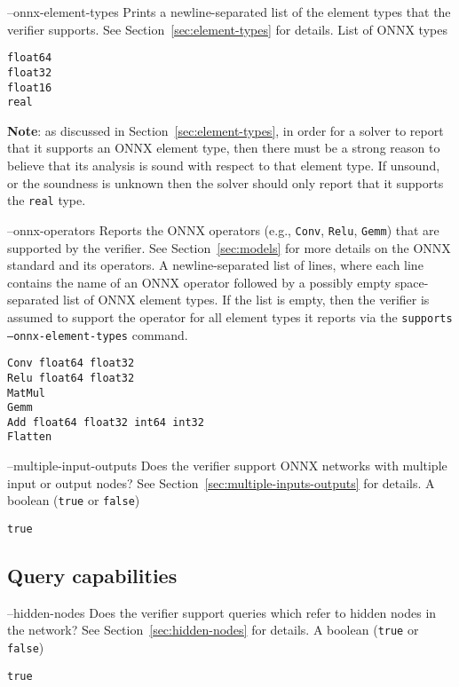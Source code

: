 \clOutputOption
{--onnx-element-types}
{Prints a newline-separated list of the element types that the verifier supports. See Section~\ref{sec:element-types} for details.}
{List of ONNX types}
\begin{lstlisting}[style=bash]
%*\exampleVerifier* supports --onnx-element-types
float64
float32
float16
real
\end{lstlisting}
\textbf{Note}: as discussed in Section~\ref{sec:element-types}, in order for a solver to report that it supports an ONNX element type, then there must be a strong reason to believe that its analysis is sound with respect to that element type. If unsound, or the soundness is unknown then the solver should only report that it supports the \texttt{real} type.

\clOutputOption
{--onnx-operators}
{Reports the ONNX operators (e.g., \texttt{Conv}, \texttt{Relu}, \texttt{Gemm}) that are supported by the verifier. See Section~\ref{sec:models} for more details on the ONNX standard and its operators. 
}
{A newline-separated list of lines, where each line contains the name of an ONNX operator followed by a possibly empty space-separated list of ONNX element types. If the list is empty, then the verifier is assumed to support the operator for all element types it reports via the \texttt{supports --onnx-element-types} command.
}
\begin{lstlisting}[style=bash]
%*\exampleVerifier* supports --onnx-operators
Conv float64 float32
Relu float64 float32
MatMul
Gemm
Add float64 float32 int64 int32
Flatten
\end{lstlisting}

\clOutputOption
{--multiple-input-outputs}
{Does the verifier support ONNX networks with multiple input or output nodes? See Section~\ref{sec:multiple-inputs-outputs} for details.}
{A boolean (\texttt{true} or \texttt{false})}
\begin{lstlisting}[style=bash]
%*\exampleVerifier* supports --multiple-inputs-outputs
true
\end{lstlisting}

\subsection{Query capabilities}

\clOutputOption
{--hidden-nodes}
{Does the verifier support queries which refer to hidden nodes in the network? See Section~\ref{sec:hidden-nodes} for details.}
{A boolean (\texttt{true} or \texttt{false})}
\begin{lstlisting}[style=bash]
%*\exampleVerifier* supports --hidden-nodes
true
\end{lstlisting}

